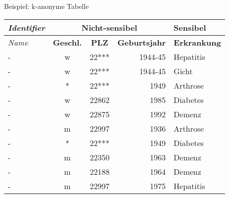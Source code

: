 \begin{frame}{Beispiel: k-anonyme Tabelle}
	\begin{center}
		\begin{tabular}{|l|c|c|r|l|}
		\hline \textit{Identifier} & \multicolumn{3}{c|}{\textbf{Nicht-sensibel}} & \textbf{Sensibel} \\ 
		\hline \textit{Name} & \textbf{Geschl.} & \textbf{PLZ} & \textbf{Geburtsjahr} & \textbf{Erkrankung} \\ \hline
		\hline \rowcolor{svshellblau1!30} - & w & 22*** & 1944-45 & Hepatitis \\ 
		\hline \rowcolor{svshellblau1!30} - & w & 22*** & 1944-45 & Gicht \\
		\hline \rowcolor{svsgrau1!30} - & * & 22*** & 1949 & Arthrose \\ 
		\hline - & w & 22862 & 1985 & Diabetes \\ 
		\hline - & w & 22875 & 1992 & Demenz \\  
		\hline - & m & 22997 & 1936 & Arthrose \\ 
		\hline \rowcolor{svsgrau1!30}- & * & 22*** & 1949 & Diabetes \\ 
		\hline - & m & 22350 & 1963 & Demenz \\ 
		\hline - & m & 22188 & 1964 & Demenz \\ 
		\hline - & m & 22997 & 1975 & Hepatitis \\ 
		\hline 
		\end{tabular}
	\end{center}
\end{frame}

